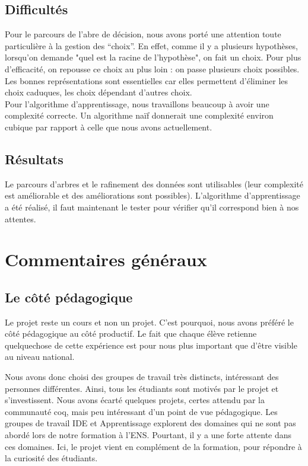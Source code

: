 \documentclass[a4paper,10pt]{article}
\begin{document}
\subsection{Difficultés}  %
Pour le parcours de l'abre de décision, nous avons porté une attention toute particulière à la gestion des ``choix''.
 En effet, comme il y a plusieurs hypothèses, lorsqu'on demande "quel est la racine de l'hypothèse", on fait un choix. 
Pour plus d'efficacité, on repousse ce choix au plus loin : on passe plusieurs choix possibles.
Les bonnes représentations sont essentielles car elles permettent d'éliminer les choix caduques, 
les choix dépendant d'autres choix. \\

Pour l'algorithme d'apprentissage, nous travaillons beaucoup à avoir une complexité correcte.
 Un algorithme naïf donnerait une complexité environ cubique par rapport à celle que nous avons actuellement. %

\subsection{Résultats}
Le parcours d'arbres et le rafinement des données sont utilisables (leur complexité est améliorable et des améliorations sont possibles).
 L'algorithme d'apprentissage a été réalisé, il faut maintenant le tester pour vérifier qu'il correspond bien à nos attentes.

\section{Commentaires généraux}
\subsection{Le côté pédagogique}
 Le projet reste un cours et non un projet. C'est pourquoi, nous avons préféré le côté pédagogique au côté productif. Le fait que chaque élève retienne quelquechose de cette expérience est pour nous plus important que d'être visible au niveau national.

 Nous avons donc choisi des groupes de travail très distincts, intéressant des personnes différentes. Ainsi, tous les étudiants sont motivés par le projet et s'investissent. Nous avons écarté quelques projets, certes attendu par la communauté coq, mais peu intéressant d'un point de vue pédagogique.
  Les groupes de travail IDE et Apprentissage explorent des domaines qui ne sont pas abordé lors de notre formation à l'ENS. Pourtant, il y a une forte attente dans ces domaines. Ici, le projet vient en complément de la formation, pour répondre à la curiosité des étudiants.
\end{document}

